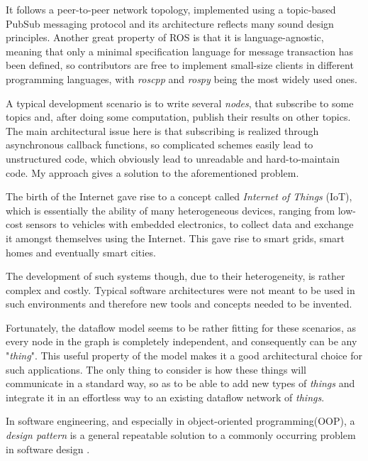 \documentclass{dithesis}
\begin{document}
It follows a peer-to-peer network topology, implemented using a topic-based PubSub messaging protocol and its architecture reflects many sound design principles. Another great property of ROS is that it is language-agnostic, meaning that only a minimal specification language for message transaction has been defined, so contributors are free to implement small-size clients in different programming languages, with \textit{roscpp} and \textit{rospy} being the most widely used ones.

A typical development scenario is to write several \textit{nodes}, that subscribe to some topics and, after doing some computation, publish their results on other topics. The main architectural issue here is that subscribing is realized through asynchronous callback functions, so complicated schemes easily lead to unstructured code, which obviously lead to unreadable and hard-to-maintain code. My approach gives a solution to the aforementioned problem.
 

The birth of the Internet gave rise to a concept called \textit{Internet of Things} (IoT), which is essentially the ability of many heterogeneous devices, ranging from low-cost sensors to vehicles with embedded electronics, to collect data and exchange it amongst themselves using the Internet. This gave rise to smart grids, smart homes and eventually smart cities. 

The development of such systems though, due to their heterogeneity, is rather complex and costly. Typical software architectures were not meant to be used in such environments and therefore new tools and concepts needed to be invented. 

Fortunately, the dataflow model seems to be rather fitting for these scenarios, as every node in the graph is completely independent, and consequently can be any "\textit{thing}". This useful property of the model makes it a good architectural choice for such applications. The only thing to consider is how these things will communicate in a standard way, so as to be able to add new types of \textit{things} and integrate it in an effortless way to an existing dataflow network of \textit{things}.


In software engineering, and especially in object-oriented programming(OOP), a \textit{design pattern} is a general repeatable solution to a commonly occurring problem in software design \cite{design}.
\end{document}
